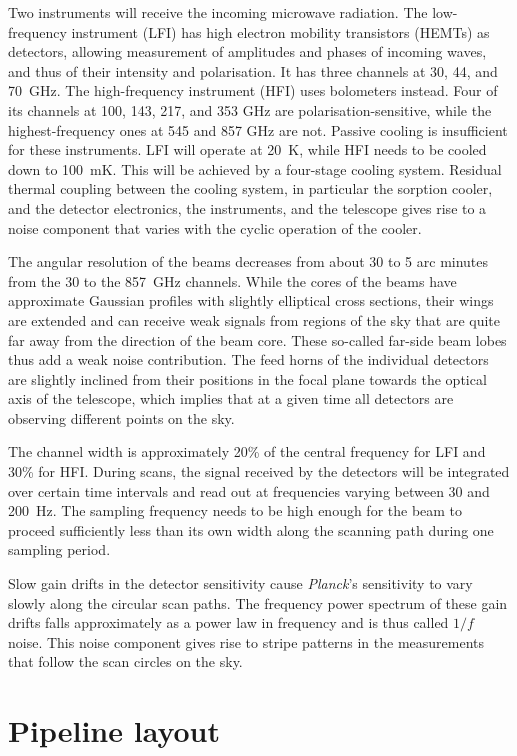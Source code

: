 \documentclass{aa}
\begin{document}
Two instruments will receive the incoming microwave radiation. The
low-frequency instrument (LFI) has high electron mobility transistors
(HEMTs) as detectors, allowing measurement of amplitudes and phases of
incoming waves, and thus of their intensity and polarisation. It has
three channels at 30, 44, and 70~GHz. The high-frequency instrument
(HFI) uses bolometers instead. Four of its channels at 100, 143, 217, and
353 GHz are polarisation-sensitive, while the highest-frequency ones at
545 and 857 GHz are not. Passive cooling is insufficient for these
instruments. LFI will operate at 20~K, while HFI needs to be cooled
down to 100~mK. This will be achieved by a four-stage cooling
system. Residual thermal coupling between the cooling system, in
particular the sorption cooler, and the detector electronics, the
instruments, and the telescope gives rise to a noise component that
varies with the cyclic operation of the cooler.

The angular resolution of the beams decreases from about 30 to 5 arc
minutes from the 30 to the 857~GHz channels. While the cores of the
beams have approximate Gaussian profiles with slightly elliptical
cross sections, their wings are extended and can receive weak signals
from regions of the sky that are quite far away from the direction of
the beam core. These so-called far-side beam lobes thus add a weak
noise contribution. The feed horns of the individual detectors are
slightly inclined from their positions in the focal plane towards the
optical axis of the telescope, which implies that at a given time all detectors
are observing different points on the sky.

The channel width is approximately 20\% of the central frequency for LFI and
30\% for HFI. During scans, the signal received by the detectors
will be integrated over certain time intervals and read out at
frequencies varying between 30 and 200~Hz. The sampling frequency needs
to be high enough for the beam to proceed sufficiently less than its
own width along the scanning path during one sampling period.

Slow gain drifts in the detector sensitivity cause \emph{Planck}'s
sensitivity to vary slowly along the circular scan paths. The
frequency power spectrum of these gain drifts falls approximately as a
power law in frequency and is thus called $1/f$ noise. This noise
component gives rise to stripe patterns in the measurements that
follow the scan circles on the sky.

\section {Pipeline layout}
\label{layout}
\end{document}
